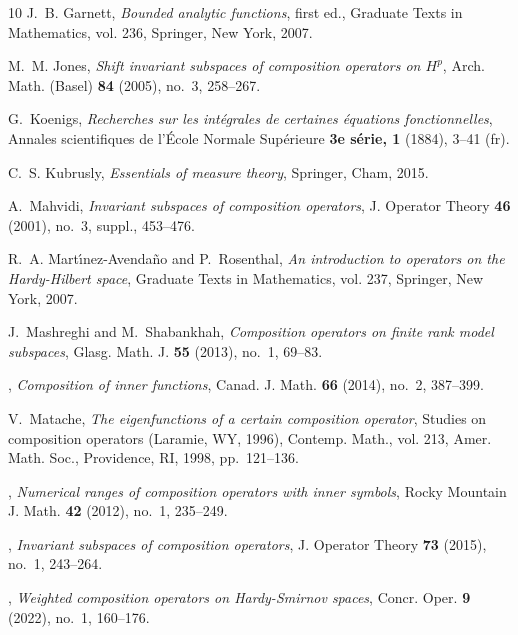 \documentclass[12pt, reqno]{amsart}
\theoremstyle{definition}
\numberwithin{equation}{section}
\begin{document}
\begin{thebibliography}{10}
	J.~B. Garnett, \emph{Bounded analytic functions}, first ed., Graduate Texts in
	Mathematics, vol. 236, Springer, New York, 2007. 
	
	M.~M. Jones, \emph{Shift invariant subspaces of composition operators on
		{$H^p$}}, Arch. Math. (Basel) \textbf{84} (2005), no.~3, 258--267.
	
	G.~Koenigs, \emph{Recherches sur les int\'egrales de certaines \'equations
		fonctionnelles}, Annales scientifiques de l'\'Ecole Normale Sup\'erieure
	\textbf{3e s{\'e}rie, 1} (1884), 3--41 (fr).
	
	C.~S. Kubrusly, \emph{Essentials of measure theory}, Springer, Cham, 2015.
	
	A.~Mahvidi, \emph{Invariant subspaces of composition operators}, J. Operator
	Theory \textbf{46} (2001), no.~3, suppl., 453--476. 
	
	R.~A. Mart\'{\i}nez-Avenda\~{n}o and P.~Rosenthal, \emph{An introduction to
		operators on the {H}ardy-{H}ilbert space}, Graduate Texts in Mathematics,
	vol. 237, Springer, New York, 2007. 
	
	J.~Mashreghi and M.~Shabankhah, \emph{Composition operators on finite rank
		model subspaces}, Glasg. Math. J. \textbf{55} (2013), no.~1, 69--83.
	
	\bysame, \emph{Composition of inner functions}, Canad. J. Math. \textbf{66}
	(2014), no.~2, 387--399. 
	
	V.~Matache, \emph{The eigenfunctions of a certain composition operator},
	Studies on composition operators ({L}aramie, {WY}, 1996), Contemp. Math.,
	vol. 213, Amer. Math. Soc., Providence, RI, 1998, pp.~121--136. 
	
	\bysame, \emph{Numerical ranges of composition operators with inner symbols},
	Rocky Mountain J. Math. \textbf{42} (2012), no.~1, 235--249. 
	
	\bysame, \emph{Invariant subspaces of composition operators}, J. Operator
	Theory \textbf{73} (2015), no.~1, 243--264. 
	
	\bysame, \emph{Weighted composition operators on {H}ardy-{S}mirnov spaces},
	Concr. Oper. \textbf{9} (2022), no.~1, 160--176. 
	

\end{thebibliography}
\end{document}
